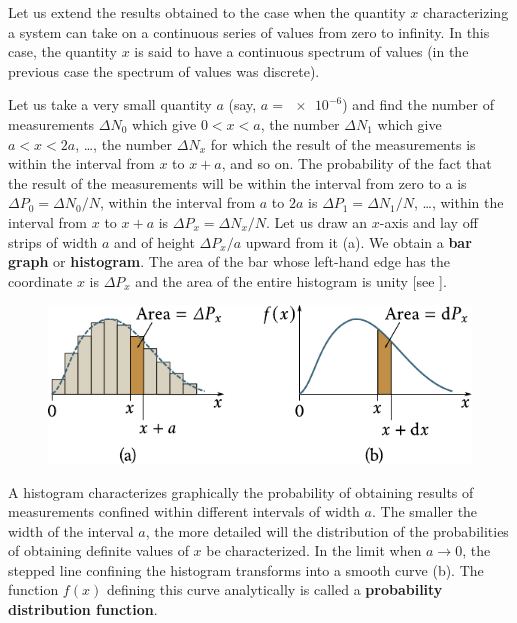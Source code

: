 Let us extend the results obtained to the case when the quantity $x$ characterizing a system can take on a continuous series of values from zero to infinity. In this case, the quantity $x$ is said to have a continuous spectrum of values (in the previous case the spectrum of values was discrete).

Let us take a very small quantity $a$ (say, $a=\num{e-6}$) and find the number of measurements $\Delta N_0$ which give $0<x<a$, the number $\Delta N_1$ which give $a<x<2a$, \ldots, the number $\Delta N_x$ for which the result of the measurements is within the interval from $x$ to $x+a$, and so on. The probability of the fact that the result of the measurements will be within the interval from zero to a is $\Delta P_0=\Delta N_0/N$, within the interval from $a$ to $2a$ is $\Delta P_1=\Delta N_1/N$, \ldots, within the interval from $x$ to $x+a$ is $\Delta P_x=\Delta N_x/N$. Let us draw an $x$-axis and lay off strips of width $a$ and of height $\Delta P_x/a$ upward from it (a). We obtain a \textbf{bar graph} or \textbf{histogram}. The area of the bar whose left-hand edge has the coordinate $x$ is $\Delta P_x$ and the area of the entire histogram is unity [see ].

\begin{figure}[t]
	\begin{center}
		\includegraphics[scale=1.0]{figures/ch_11/fig_11_1.pdf}
		\caption[]{}
		\label{fig:11_1}
	\end{center}
	\vspace{-0.8cm}
\end{figure}

A histogram characterizes graphically the probability of obtaining results of measurements confined within different intervals of width $a$. The smaller the width of the interval $a$, the more detailed will the distribution of the probabilities of obtaining definite values of $x$ be characterized. In the limit when $a\to 0$, the stepped line confining the histogram transforms into a smooth curve (b). The function $f(x)$ defining this curve analytically is called a \textbf{probability distribution function}.

